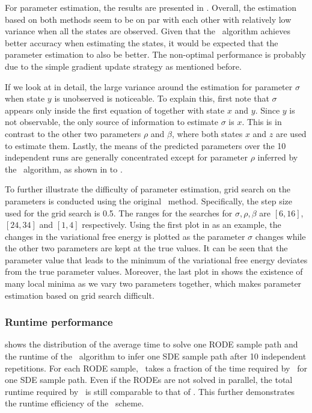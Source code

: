 For parameter estimation, the results are presented in .
Overall, the estimation based on both methods seem to be on par with each other with relatively low variance when all the states are observed.
Given that the \algovgpamap\ algorithm achieves better accuracy when estimating the states, it would be expected that the parameter estimation to also be better.
The non-optimal performance is probably due to the simple gradient update strategy as mentioned before.

If we look at  in detail, the large variance around the estimation for parameter $\sigma$ when state $y$ is unobserved is noticeable.
To explain this, first note that $\sigma$ appears only inside the first equation of  together with state $x$ and $y$.
Since $y$ is not observable, the only source of information to estimate $\sigma$ is  $x$.
This is in contrast to the other two parameters $\rho$ and $\beta$, where both states $x$ and $z$ are used to estimate them.
Lastly, the means of the predicted parameters over the 10 independent runs are generally concentrated except for parameter $\rho$ inferred by the \algovgpamap\ algorithm, as shown in  to .

To further illustrate the difficulty of parameter estimation, grid search on the parameters is conducted using the original \algovgpa\ method.
Specifically, the step size used for the grid search is 0.5. 
The ranges for the searches for $\sigma, \rho, \beta$ are $[6, 16]$, $[24, 34]$ and $[1, 4]$ respectively.
Using the first plot in  as an example, the changes in the variational free energy is plotted as the parameter $\sigma$ changes while the other two parameters are kept at the true values.
It can be seen that the parameter value that leads to the minimum of the variational free energy deviates from the true parameter values.
Moreover, the last plot in  shows the existence of many local minima as we vary two parameters together, which makes parameter estimation based on grid search difficult.

\subsubsection*{Runtime performance}

 shows the distribution of the average time to solve one RODE sample path and the runtime of the \algovgpamap\ algorithm to infer one SDE sample path after 10 independent repetitions. 
For each RODE sample, \algolpmfsde\ takes a fraction of the time required by \algovgpamap\ for one SDE sample path.
Even if the RODEs are not solved in parallel, the total runtime required by \algolpmfsde\ is still comparable to that of \algovgpamap. 
This further demonstrates the runtime efficiency of the \algolpmfsde\ scheme.

